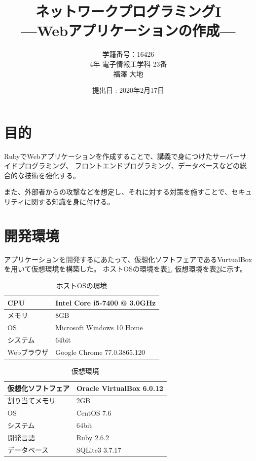 \documentclass[a4j,titlepage]{jsarticle}
\begin{document}
\begin{titlepage}
  \title{\huge{ネットワークプログラミングI} \\ \LARGE{---Webアプリケーションの作成---}}
	\author{学籍番号：16426 \\ 4年 電子情報工学科 23番 \\ 福澤 大地}
	\date{提出日 : 2020年2月17日}
  \maketitle
\end{titlepage}


\section{目的}
RubyでWebアプリケーションを作成することで、講義で身につけたサーバーサイドプログラミング、
フロントエンドプログラミング、データベースなどの総合的な技術を強化する。

また、外部者からの攻撃などを想定し、それに対する対策を施すことで、セキュリティに関する知識を身に付ける。


\section{開発環境}
アプリケーションを開発するにあたって、仮想化ソフトフェアであるVurtualBoxを用いて仮想環境を構築した。
ホストOSの環境を表\ref{tb:kan}, 仮想環境を表\ref{tb:virtual}に示す。

\begin{table}[H]
  \centering
  \caption{ホストOSの環境}
  \label{tb:kan}

  \begin{tabular}{|l|l|}
    \hline
    CPU & Intel Core i5-7400 @ 3.0GHz \\ \hline
    メモリ & 8GB \\ \hline
    OS & Microsoft Windows 10 Home \\ \hline
    システム & 64bit \\ \hline
    Webブラウザ & Google Chrome 77.0.3865.120 \\ \hline
  \end{tabular}
\end{table}

\begin{table}[H]
  \centering
  \caption{仮想環境}
  \label{tb:virtual}

  \begin{tabular}{|l|l|}
    \hline
    仮想化ソフトフェア & Oracle VirtualBox 6.0.12 \\ \hline
    割り当てメモリ & 2GB \\ \hline
    OS & CentOS 7.6 \\ \hline
    システム & 64bit \\ \hline
    開発言語 & Ruby 2.6.2 \\ \hline
    データベース & SQLite3 3.7.17 \\ \hline
  \end{tabular}
\end{table}
\end{document}
